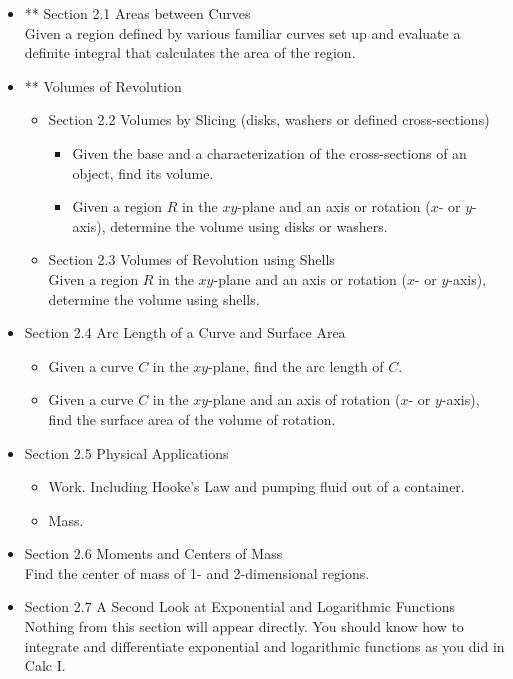 \documentclass[11pt,fleqn]{article}
\begin{document}
\begin{itemize}

\item ** Section 2.1 Areas between Curves\\
Given a region defined by various familiar curves set up and evaluate a definite integral that calculates the area of the region.
\item ** Volumes of Revolution
	\begin{itemize} 
	\item Section 2.2 Volumes by Slicing (disks, washers or defined cross-sections)
		\begin{itemize}
		\item Given the base and a characterization of the cross-sections of an object, find its volume.
		\item Given a region $R$ in the $xy$-plane and an axis or rotation ($x$- or $y$-axis), determine the volume using disks or washers.
		\end{itemize}
	\item Section 2.3 Volumes of Revolution using Shells\\
Given a region $R$ in the $xy$-plane and an axis or rotation ($x$- or $y$-axis), determine the volume using shells.
	\end{itemize}
\item Section 2.4 Arc Length of a Curve and Surface Area
	\begin{itemize}
	\item Given a curve $C$ in the $xy$-plane, find the arc length of $C$. 
	\item Given a curve $C$ in the $xy$-plane and an axis of rotation ($x$- or $y$-axis), find the surface area of the volume of rotation.
	\end{itemize}
\item Section 2.5 Physical Applications
	\begin{itemize}
	\item Work. Including Hooke's Law and pumping fluid out of a container.
	\item Mass.
	\end{itemize}
\item Section 2.6 Moments and Centers of Mass\\
Find the center of mass of 1- and 2-dimensional regions.
\item Section 2.7 A Second Look at Exponential and Logarithmic Functions\\
Nothing from this section will appear directly. You should know how to integrate and differentiate exponential and logarithmic functions as you did in Calc I.


\end{itemize}
\end{document}
